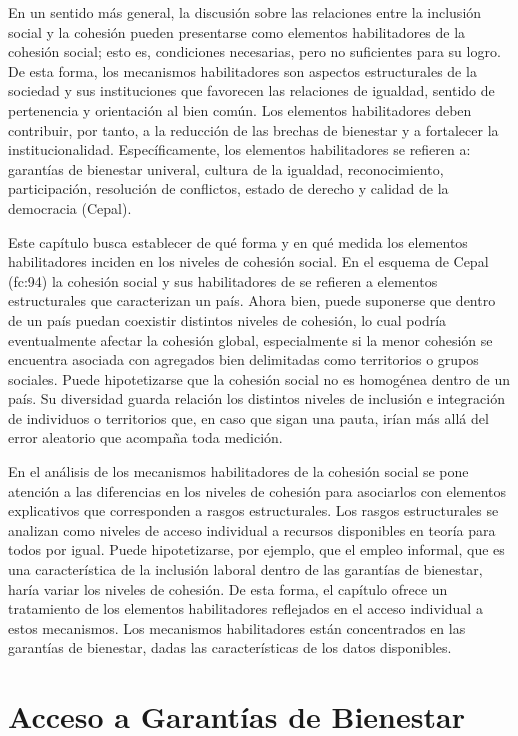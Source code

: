 \documentclass[
  12pt,
]{book}
\begin{document}
En un sentido más general, la discusión sobre las relaciones entre la inclusión social y la cohesión pueden presentarse como elementos habilitadores de la cohesión social; esto es, condiciones necesarias, pero no suficientes para su logro. De esta forma, los mecanismos habilitadores son aspectos estructurales de la sociedad y sus instituciones que favorecen las relaciones de igualdad, sentido de pertenencia y orientación al bien común. Los elementos habilitadores deben contribuir, por tanto, a la reducción de las brechas de bienestar y a fortalecer la institucionalidad. Específicamente, los elementos habilitadores se refieren a: garantías de bienestar univeral, cultura de la igualdad, reconocimiento, participación, resolución de conflictos, estado de derecho y calidad de la democracia (Cepal).

Este capítulo busca establecer de qué forma y en qué medida los elementos habilitadores inciden en los niveles de cohesión social. En el esquema de Cepal (fc:94) la cohesión social y sus habilitadores de se refieren a elementos estructurales que caracterizan un país. Ahora bien, puede suponerse que dentro de un país puedan coexistir distintos niveles de cohesión, lo cual podría eventualmente afectar la cohesión global, especialmente si la menor cohesión se encuentra asociada con agregados bien delimitadas como territorios o grupos sociales. Puede hipotetizarse que la cohesión social no es homogénea dentro de un país. Su diversidad guarda relación los distintos niveles de inclusión e integración de individuos o territorios que, en caso que sigan una pauta, irían más allá del error aleatorio que acompaña toda medición.

En el análisis de los mecanismos habilitadores de la cohesión social se pone atención a las diferencias en los niveles de cohesión para asociarlos con elementos explicativos que corresponden a rasgos estructurales. Los rasgos estructurales se analizan como niveles de acceso individual a recursos disponibles en teoría para todos por igual. Puede hipotetizarse, por ejemplo, que el empleo informal, que es una característica de la inclusión laboral dentro de las garantías de bienestar, haría variar los niveles de cohesión. De esta forma, el capítulo ofrece un tratamiento de los elementos habilitadores reflejados en el acceso individual a estos mecanismos. Los mecanismos habilitadores están concentrados en las garantías de bienestar, dadas las características de los datos disponibles.

\hypertarget{acceso-a-garantuxedas-de-bienestar}{%
\section{Acceso a Garantías de Bienestar}\label{acceso-a-garantuxedas-de-bienestar}}
\end{document}
